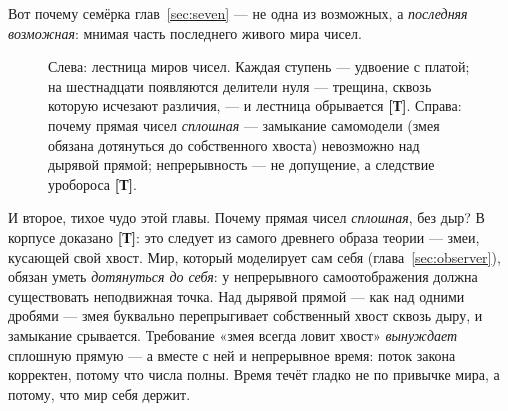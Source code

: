 \documentclass[11pt,letterpaper]{article}
\newcommand{\stT}{\textbf{[Т]}\xspace}
\begin{document}
Вот почему семёрка глав~\ref{sec:seven} --- не одна из возможных, а
\emph{последняя возможная}: мнимая часть последнего живого мира чисел.

\begin{figure}[H]
\centering
{}
\caption{Слева: лестница миров чисел. Каждая ступень --- удвоение с
платой; на шестнадцати появляются делители нуля --- трещина, сквозь
которую исчезают различия, --- и лестница обрывается \stT. Справа:
почему прямая чисел \emph{сплошная} --- замыкание самомодели (змея
обязана дотянуться до собственного хвоста) невозможно над дырявой
прямой; непрерывность --- не допущение, а следствие уробороса \stT.}
\label{fig:numbers}
\end{figure}

И второе, тихое чудо этой главы. Почему прямая чисел \emph{сплошная},
без дыр? В корпусе доказано \stT{}: это следует из самого древнего
образа теории --- змеи, кусающей свой хвост. Мир, который моделирует
сам себя (глава~\ref{sec:observer}), обязан уметь \emph{дотянуться до
себя}: у непрерывного самоотображения должна существовать неподвижная
точка. Над дырявой прямой --- как над одними дробями --- змея
буквально перепрыгивает собственный хвост сквозь дыру, и замыкание
срывается. Требование «змея всегда ловит хвост» \emph{вынуждает}
сплошную прямую --- а вместе с ней и непрерывное время: поток закона
корректен, потому что числа полны. Время течёт гладко не по
привычке мира, а потому, что мир себя держит.
\end{document}

